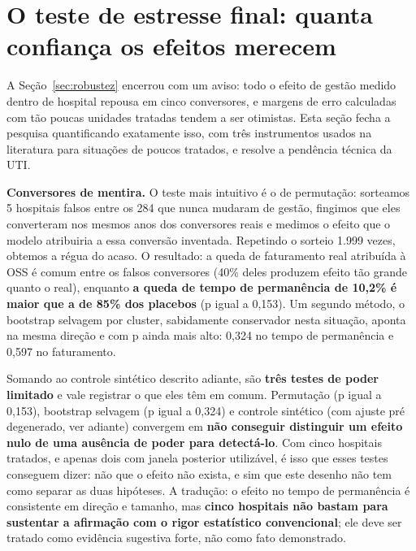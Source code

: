 \section{O teste de estresse final: quanta confiança os efeitos merecem}
\label{sec:inferenciafinal}

A Seção~\ref{sec:robustez} encerrou com um aviso: todo o efeito de
gestão medido dentro de hospital repousa em cinco conversores, e
margens de erro calculadas com tão poucas unidades tratadas tendem a
ser otimistas. Esta seção fecha a pesquisa quantificando exatamente
isso, com três instrumentos usados na literatura para situações de
poucos tratados, e resolve a pendência técnica da UTI.

\textbf{Conversores de mentira.} O teste mais intuitivo é o de
permutação: sorteamos 5 hospitais falsos entre os 284 que nunca
mudaram de gestão, fingimos que eles converteram nos mesmos anos dos
conversores reais e medimos o efeito que o modelo atribuiria a essa
conversão inventada. Repetindo o sorteio 1.999 vezes, obtemos a régua
do acaso. O resultado: a queda de faturamento real atribuída à OSS é comum
entre os falsos conversores (40\% deles produzem efeito tão grande
quanto o real), enquanto \textbf{a queda de tempo de permanência de
10,2\% é maior que a de 85\% dos placebos} (p igual a 0,153). Um
segundo método, o bootstrap selvagem por cluster, sabidamente
conservador nesta situação, aponta na mesma direção e com p ainda mais
alto: 0,324 no tempo de permanência e 0,597 no faturamento.

Somando ao controle sintético descrito adiante, são \textbf{três testes
de poder limitado} e vale registrar o que eles têm em comum. Permutação
(p igual a 0,153), bootstrap selvagem (p igual a 0,324) e controle
sintético (com ajuste pré degenerado, ver adiante) convergem em
\textbf{não conseguir distinguir um efeito nulo de uma ausência de
poder para detectá-lo}. Com cinco hospitais tratados, e apenas dois com
janela posterior utilizável, é isso que esses testes conseguem dizer:
não que o efeito não exista, e sim que este desenho não tem como
separar as duas hipóteses. A tradução: o
efeito no tempo de permanência é consistente em direção e tamanho, mas
\textbf{cinco hospitais não bastam para sustentar a afirmação com o
rigor estatístico convencional}; ele deve ser tratado como evidência
sugestiva forte, não como fato demonstrado.

